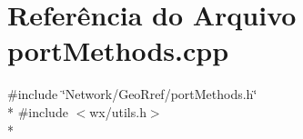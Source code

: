 \section{Referência do Arquivo port\+Methods.\+cpp}
\label{port_methods_8cpp}
{\ttfamily \#include \char`\"{}Network/\+Geo\+Rref/port\+Methods.\+h\char`\"{}}\\*
{\ttfamily \#include $<$wx/utils.\+h$>$}\\*
